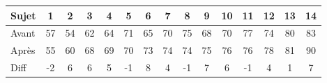 \documentclass{standalone}
\begin{document}
\begin{tabular}{l|cccccccccccccc}
	Sujet & 1 & 2 & 3 & 4 & 5 & 6 & 7 & 8 & 9 & 10 & 11 & 12 & 13 &
	14\\ \hline
	Avant   & 57 & 54 & 62 & 64 & 71 & 65 & 70 & 75 & 68 & 70 & 77 & 74 & 80 & 83\\
	Apr\`es & 55 & 60 & 68 & 69 & 70 & 73 & 74 & 74 & 75 & 76 & 76 & 78 & 81 & 90 \\
	Diff    & -2 & 6  & 6  & 5  & -1 & 8  & 4  & -1 & 7  & 6  & -1 & 4  & 1  & 7
\end{tabular}
\end{document}
